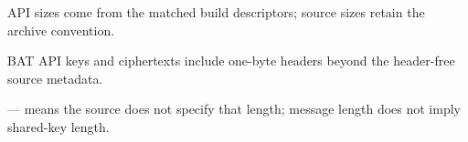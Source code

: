 \begin{table}[t]
\centering
\caption{Matched peer API wire sizes}
\label{tab:matched-peer-sizes}
\begin{minipage}{\textwidth}\footnotesize
API sizes come from the matched build descriptors; source sizes retain the archive convention.\par
BAT API keys and ciphertexts include one-byte headers beyond the header-free source metadata.\par
--- means the source does not specify that length; message length does not imply shared-key length.\par
\end{minipage}
\end{table}
